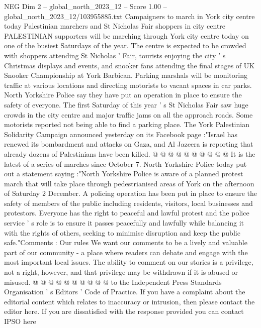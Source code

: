 \begin{textsample}{NEG Dim 2 – global\_north\_2023\_12 – Score 1.00 – global\_north\_2023\_12/103955885.txt}  \label{ex:f2_neg_207}
Campaigners to march in York city centre today Palestinian marchers and St Nicholas Fair shoppers in city centre PALESTINIAN supporters will be marching through York city centre today on one of the busiest Saturdays of the year.
The centre is expected to be crowded with shoppers attending St Nicholas ' Fair, tourists enjoying the city ' s Christmas displays and events, and snooker fans attending the final stages of UK Snooker Championship at York Barbican.
Parking marshals will be monitoring traffic at various locations and directing motorists to vacant spaces in car parks.
North Yorkshire Police say they have put an operation in place to ensure the safety of everyone.
The first Saturday of this year ' s St Nicholas Fair saw huge crowds in the city centre and major traffic jams on all the approach roads.
Some motorists reported not being able to find a parking place.
The York Palestinian Solidarity Campaign announced yesterday on its Facebook page :"Israel has renewed its bombardment and attacks on Gaza, and Al Jazeera is reporting that already dozens of Palestinians have been killed. @ @ @ @ @ @ @ @ @ @ It is the latest of a series of marches since October 7.
North Yorkshire Police today put out a statement saying :"North Yorkshire Police is aware of a planned protest march that will take place through pedestrianised areas of York on the afternoon of Saturday 2 December.
A policing operation has been put in place to ensure the safety of members of the public including residents, visitors, local businesses and protestors.
Everyone has the right to peaceful and lawful protest and the police service ' s role is to ensure it passes peacefully and lawfully while balancing it with the rights of others, seeking to minimise disruption and keep the public safe."Comments : Our rules We want our comments to be a lively and valuable part of our community - a place where readers can debate and engage with the most important local issues.
The ability to comment on our stories is a privilege, not a right, however, and that privilege may be withdrawn if it is abused or misused. @ @ @ @ @ @ @ @ @ @ to the Independent Press Standards Organisation ' s Editors ' Code of Practice.
If you have a complaint about the editorial content which relates to inaccuracy or intrusion, then please contact the editor here.
If you are dissatisfied with the response provided you can contact IPSO here

\end{textsample}
